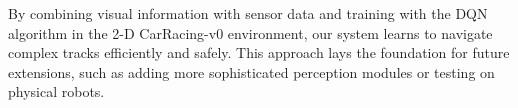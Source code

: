 By combining visual information with sensor data and training with the DQN algorithm in the 2-D CarRacing-v0 environment, our system learns to navigate complex tracks efficiently and safely. This approach lays the foundation for future extensions, such as adding more sophisticated perception modules or testing on physical robots.

